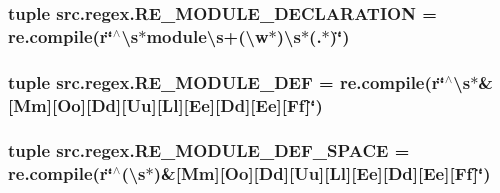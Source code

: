 \hypertarget{namespacesrc_1_1regex_a728a077eb302fe974927695df1359300}{
\subsubsection[{R\-E\-\_\-\-M\-O\-D\-U\-L\-E\-\_\-\-D\-E\-C\-L\-A\-R\-A\-T\-I\-O\-N}]{\setlength{\rightskip}{0pt plus 5cm}tuple src.\-regex.\-R\-E\-\_\-\-M\-O\-D\-U\-L\-E\-\_\-\-D\-E\-C\-L\-A\-R\-A\-T\-I\-O\-N = re.\-compile(r\char`\"{}$^\wedge$\textbackslash{}s$\ast$module\textbackslash{}s+(\textbackslash{}w$\ast$)\textbackslash{}s$\ast$(.$\ast$)\char`\"{})}}\label{namespacesrc_1_1regex_a728a077eb302fe974927695df1359300}
\hypertarget{namespacesrc_1_1regex_aacf12894450959f9e09e4f0a3a7b9e36}{
\subsubsection[{R\-E\-\_\-\-M\-O\-D\-U\-L\-E\-\_\-\-D\-E\-F}]{\setlength{\rightskip}{0pt plus 5cm}tuple src.\-regex.\-R\-E\-\_\-\-M\-O\-D\-U\-L\-E\-\_\-\-D\-E\-F = re.\-compile(r\char`\"{}$^\wedge$\textbackslash{}s$\ast$\&\mbox{[}Mm\mbox{]}\mbox{[}Oo\mbox{]}\mbox{[}Dd\mbox{]}\mbox{[}Uu\mbox{]}\mbox{[}Ll\mbox{]}\mbox{[}Ee\mbox{]}\mbox{[}Dd\mbox{]}\mbox{[}Ee\mbox{]}\mbox{[}Ff\mbox{]}\char`\"{})}}\label{namespacesrc_1_1regex_aacf12894450959f9e09e4f0a3a7b9e36}
\hypertarget{namespacesrc_1_1regex_a559ff72fbe5a09f25dc74a33b2895de7}{
\subsubsection[{R\-E\-\_\-\-M\-O\-D\-U\-L\-E\-\_\-\-D\-E\-F\-\_\-\-S\-P\-A\-C\-E}]{\setlength{\rightskip}{0pt plus 5cm}tuple src.\-regex.\-R\-E\-\_\-\-M\-O\-D\-U\-L\-E\-\_\-\-D\-E\-F\-\_\-\-S\-P\-A\-C\-E = re.\-compile(r\char`\"{}$^\wedge$(\textbackslash{}s$\ast$)\&\mbox{[}Mm\mbox{]}\mbox{[}Oo\mbox{]}\mbox{[}Dd\mbox{]}\mbox{[}Uu\mbox{]}\mbox{[}Ll\mbox{]}\mbox{[}Ee\mbox{]}\mbox{[}Dd\mbox{]}\mbox{[}Ee\mbox{]}\mbox{[}Ff\mbox{]}\char`\"{})}}\label{namespacesrc_1_1regex_a559ff72fbe5a09f25dc74a33b2895de7}
